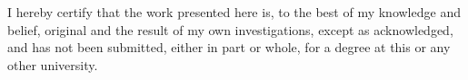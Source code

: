 I hereby certify that the work presented here is, to the best of my knowledge 
and belief, original and the result of my own investigations, except as 
acknowledged, and has not been submitted, either in part or whole, for a degree 
at this or any other university.
\vspace{2in}
